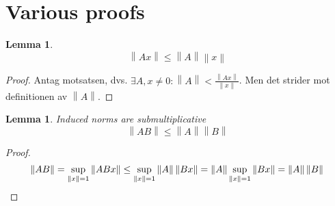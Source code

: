 \documentclass{article}
\newtheorem{lemma}[theorem]{Lemma}
\newcommand{\norm}[1]{\left\lVert#1\right\rVert}
\begin{document}
\appendix

\section{Various proofs}

\begin{lemma}
	$$ \norm{Ax} \le \norm A \norm x $$
\end{lemma}
\begin{proof}
	Antag motsatsen, dvs. $\exists A, x \ne 0 : \norm A < \frac{\norm{Ax}}{\norm x}$.
	Men det strider mot definitionen av $\norm A$.
\end{proof}
\begin{lemma}{Induced norms are submultiplicative}\label{le:norm_submultiplicative}
	$$ \norm{AB} \le \norm A \norm B $$
\end{lemma}
\begin{proof}
	$$ \norm{AB} = \sup_{\norm x = 1} \norm{ABx} \le \sup_{\norm x = 1} \norm A \norm{Bx}
	= \norm A \sup_{\norm x = 1} \norm{Bx} = \norm A \norm B \qedhere $$
\end{proof}
\end{document}
